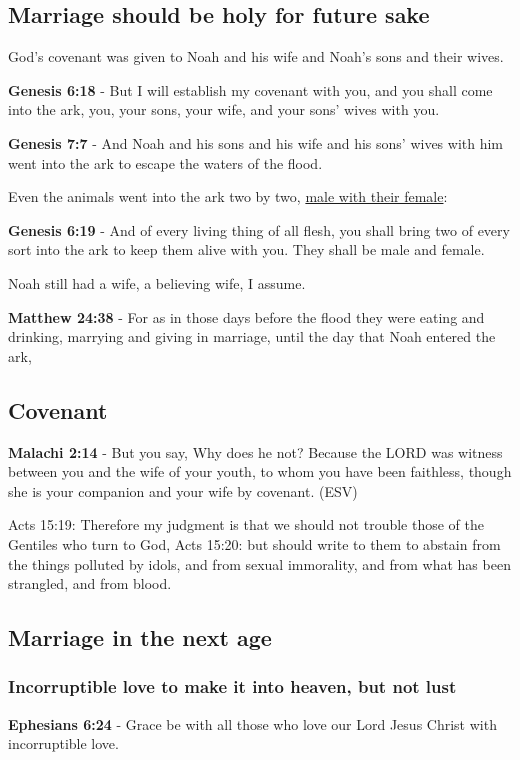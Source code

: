 \documentclass[11pt]{article}
\begin{document}
\subsection{Marriage should be holy for future sake}
\label{sec:orgc5b0ec7}
God's covenant was given to Noah and his wife and Noah's sons and their wives.

\textbf{Genesis 6:18} - But I will establish my covenant with you, and you shall come into the ark, you, your sons, your wife, and your sons' wives with you.

\textbf{Genesis 7:7} - And Noah and his sons and his wife and his sons' wives with him went into the ark to escape the waters of the flood.

Even the animals went into the ark two by two, \uline{male with their female}:

\textbf{Genesis 6:19} - And of every living thing of all flesh, you shall bring two of every sort into the ark to keep them alive with you. They shall be male and female.

Noah still had a wife, a believing wife, I assume.

\textbf{Matthew 24:38} - For as in those days before the flood they were eating and drinking, marrying and giving in marriage, until the day that Noah entered the ark,

\subsection{Covenant}
\label{sec:org1ce65a7}
\textbf{Malachi 2:14} - But you say, Why does he not?  Because the LORD was witness between you and the wife of your youth, to whom you have been faithless, though she is your companion and your wife by covenant.  (ESV)

Acts 15:19: Therefore my judgment is that we should not trouble those of the Gentiles who turn to God,
Acts 15:20: but should write to them to abstain from the things polluted by idols, and from sexual immorality, and from what has been strangled, and from blood.

\subsection{Marriage in the next age}
\label{sec:org45c2a4a}
\subsubsection{Incorruptible love to make it into heaven, but not lust}
\label{sec:orgb80c282}
\textbf{Ephesians 6:24} - Grace be with all those who love our Lord Jesus Christ with incorruptible love.
\end{document}
